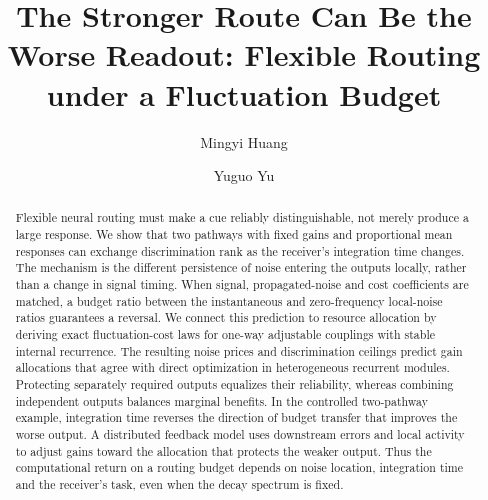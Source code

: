 \documentclass[aps,10pt,onecolumn,superscriptaddress,nofootinbib,longbibliography,
  amsmath,amssymb,floatfix]{revtex4-2}
\begin{document}
\title{The Stronger Route Can Be the Worse Readout: Flexible Routing under a Fluctuation Budget}
\author{Mingyi Huang}
\author{Yuguo Yu}

\begin{abstract}
Flexible neural routing must make a cue reliably distinguishable,
not merely produce a large response. We show that two pathways
with fixed gains and proportional mean responses can exchange
discrimination rank as the receiver's integration time changes.
The mechanism is the different persistence of noise entering the
outputs locally, rather than a change in signal timing. When
signal, propagated-noise and cost coefficients are matched, a budget ratio
between the instantaneous and zero-frequency local-noise ratios
guarantees a reversal. We connect this prediction to resource
allocation by deriving exact fluctuation-cost laws for one-way
adjustable couplings with stable internal recurrence. The resulting
noise prices and discrimination ceilings predict gain allocations
that agree with direct optimization in heterogeneous recurrent
modules. Protecting separately required outputs equalizes their
reliability, whereas combining independent outputs balances marginal
benefits. In the controlled two-pathway example, integration time
reverses the direction of budget transfer that improves the worse
output. A distributed feedback model uses downstream errors and
local activity to adjust gains toward the allocation that protects
the weaker output. Thus the computational return on a routing budget depends
on noise location, integration time and the receiver's task, even
when the decay spectrum is fixed.
\end{abstract}
\maketitle
\end{document}
